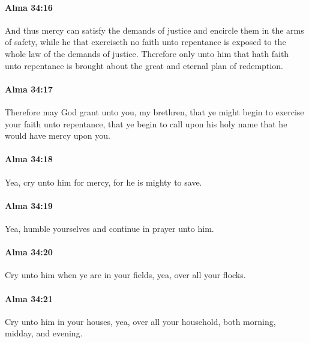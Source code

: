 		\paragraph{Alma 34:16} %
			\label{ALMA-34-16}

			And thus mercy can satisfy the demands of justice
			and encircle them in the arms of safety,
			while he that exerciseth no faith unto repentance
			is exposed to the whole law of the demands of justice.
			Therefore only unto him that hath faith unto repentance
			is brought about the great and eternal plan of redemption.

		\paragraph{Alma 34:17} %
			\label{ALMA-34-17}

			Therefore may God grant unto you, my brethren,
			that ye might begin to exercise your faith unto repentance,
			that ye begin to call upon his holy name
			that he would have mercy upon you.

		\paragraph{Alma 34:18} %
			\label{ALMA-34-18}

			Yea, cry unto him for mercy, for he is mighty to save.

		\paragraph{Alma 34:19} %
			\label{ALMA-34-19}

			Yea, humble yourselves and continue in prayer unto him.

		\paragraph{Alma 34:20} %
			\label{ALMA-34-20}

			Cry unto him when ye are in your fields,
			yea, over all your flocks.

		\paragraph{Alma 34:21} %
			\label{ALMA-34-21}

			Cry unto him in your houses, yea, over all your household,
			both morning, midday, and evening.

